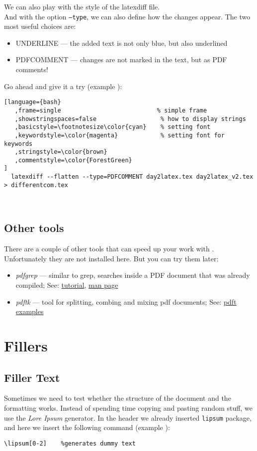 \documentclass[a4paper,10pt]{report} %
\newcounter{samplecode}[chapter]
\begin{document}
We can also play with the style of the latexdiff file. \\


And with the option \texttt{--type}, we can also define how the changes appear. The two most useful choices are:
\begin{itemize}
 \item UNDERLINE --- the added text is not only blue, but also underlined 
 \item PDFCOMMENT --- changes are not marked in the text, but as PDF comments! 
\end{itemize}

Go ahead and give it a try  (example ):

\begin{lstlisting}[language={bash}
   ,frame=single                           % simple frame 
   ,showstringspaces=false                  % how to display strings
   ,basicstyle=\footnotesize\color{cyan}    % setting font
   ,keywordstyle=\color{magenta}            % setting font for keywords 
   ,stringstyle=\color{brown}
   ,commentstyle=\color{ForestGreen} 
]
  latexdiff --flatten --type=PDFCOMMENT day2latex.tex day2latex_v2.tex > differentcom.tex
\end{lstlisting}~\vspace{0ex}

\subsection{Other tools}

There are a couple of other tools that can speed up your work with .
Unfortunately they are not installed here. But you can try them later:
\begin{itemize}
    \item \emph{pdfgrep} --- similar to grep, searches inside a PDF document that was already compiled; See: \href{https://www.geeksforgeeks.org/pdfgrep-command-in-linux/}{tutorial},  \href{https://pdfgrep.org/doc.html}{man page}
    \item \emph{pdftk} --- tool for splitting, combing and mixing pdf documents; See: \href{https://www.pdflabs.com/docs/pdftk-cli-examples/}{pdft examples}
\end{itemize}


\section{Fillers}
 \subsection{Filler Text}
 Sometimes we need to test whether the structure of the document and the formatting works. Instead of spending time copying and pasting random stuff, we use the  \emph{Lore Ipsum} generator.
In the header we already inserted \texttt{lipsum} package, and here we insert the following command (example ):
\begin{lstlisting}[language={[latex]tex}, frame=single,basicstyle=\footnotesize]
  \lipsum[0-2]    %generates dummy text
\end{lstlisting}
\end{document}
